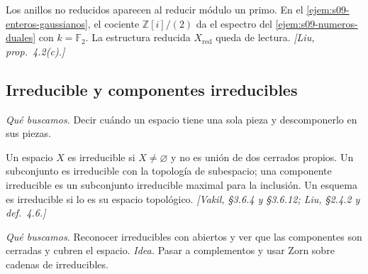 \begin{obs}
\label{obs:s09-estructura-reducida}
Los anillos no reducidos aparecen al reducir módulo un primo. En el \cref{ejem:s09-enteros-gaussianos}, el cociente $\mathbb Z[i]/(2)$ da el espectro del \cref{ejem:s09-numeros-duales} con $k=\mathbb F_2$. La estructura reducida $X_{\mathrm{red}}$ queda de lectura. \emph{[Liu, prop.~4.2(c).]}
\end{obs}

\subsection{Irreducible y componentes irreducibles}
\emph{Qué buscamos.} Decir cuándo un espacio tiene una sola pieza y descomponerlo en sus piezas.

\begin{defi}
\label{defi:s09-irreducible}
Un espacio $X$ es irreducible si $X\ne\varnothing$ y no es unión de dos cerrados propios. Un subconjunto es irreducible con la topología de subespacio; una componente irreducible es un subconjunto irreducible maximal para la inclusión. Un esquema es irreducible si lo es su espacio topológico. \emph{[Vakil, \S3.6.4 y \S3.6.12; Liu, \S2.4.2 y def.~4.6.]}
\end{defi}

\emph{Qué buscamos.} Reconocer irreducibles con abiertos y ver que las componentes son cerradas y cubren el espacio. \emph{Idea.} Pasar a complementos y usar Zorn sobre cadenas de irreducibles.


